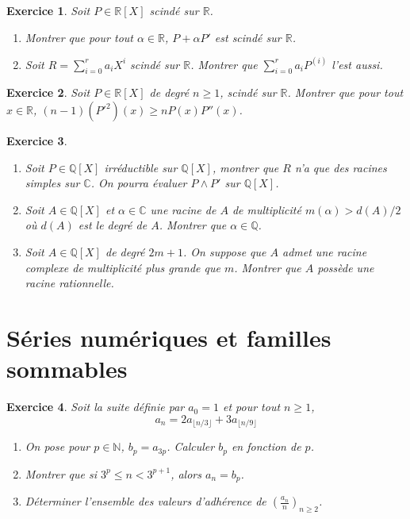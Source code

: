 \documentclass[12pt]{article}
\newtheorem{exercise}{Exercice}[section]
\theoremstyle{remark}
\theoremstyle{remark}
\newcommand{\R}{\mathbb{R}}
\newcommand{\C}{\mathbb{C}}
\newcommand{\Q}{\mathbb{Q}}
\newcommand{\N}{\mathbb{N}}
\begin{document}
\begin{exercise}
	Soit $P\in\R[X]$ scindé sur $\R$.
	\begin{enumerate}
		\item Montrer que pour tout $\alpha\in\R$, $P+\alpha P'$ est scindé sur $\R$.
		\item Soit $R=\sum_{i=0}^{r}a_{i}X^{i}$ scindé sur $\R$. Montrer que
		$\sum_{i=0}^{r}a_{i}P^{(i)}$ l'est aussi.
	\end{enumerate}
\end{exercise}

\begin{exercise}
	Soit $P\in\R[X]$ de degré $n\geqslant1$, scindé sur $\R$. Montrer que pour
	tout $x\in\R$, $(n-1)(P'^{2})(x)\geqslant nP(x)P''(x)$.
\end{exercise}

\begin{exercise}
	\phantom{}
	\begin{enumerate}
		\item Soit $P\in\Q[X]$ irréductible sur $\Q[X]$, montrer que $R$ n'a que
		des racines simples sur $\C$. On pourra évaluer $P\wedge P'$ sur
		$\Q[X]$.
		\item Soit $A\in\Q[X]$ et $\alpha\in\C$ une racine de $A$ de
		multiplicité $m(\alpha)>d(A)/2$ où $d(A)$ est le degré de $A$. Montrer
		que $\alpha\in\Q$.
		\item Soit $A\in\Q[X]$ de degré $2m+1$. On suppose que $A$ admet une
		racine complexe de multiplicité plus grande que $m$. Montrer que $A$
		possède une racine rationnelle.
	\end{enumerate}
\end{exercise}

\cleardoublepage
\section{Séries numériques et familles sommables}

\begin{exercise}
	Soit la suite définie par $a_{0}=1$ et pour tout $n\geqslant1$,
	$$a_{n}=2a_{\lfloor n/3\rfloor}+3a_{\lfloor n/9\rfloor}$$
	\begin{enumerate}
		\item On pose pour $p\in\N$, $b_{p}=a_{3p}$. Calculer $b_{p}$ en
		fonction de $p$.
		\item Montrer que si $3^{p}\leqslant n<3^{p+1}$, alors $a_{n}=b_{p}$.
		\item Déterminer l'ensemble des valeurs d'adhérence de
		$(\frac{a_{n}}{n})_{n\geqslant 2}$.
	\end{enumerate}
\end{exercise}
\end{document}
